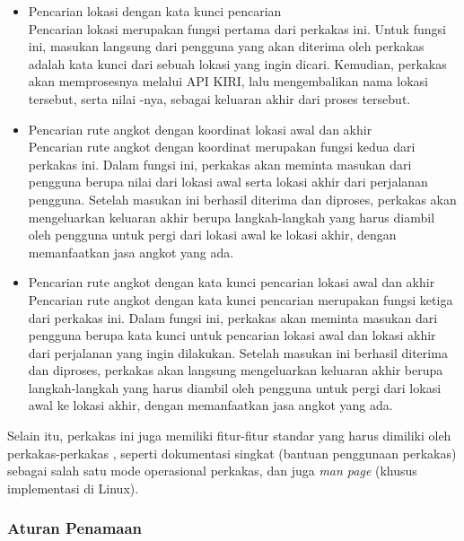 \begin{itemize}
	\item Pencarian lokasi dengan kata kunci pencarian\\
	Pencarian lokasi merupakan fungsi pertama dari perkakas ini. Untuk fungsi ini, masukan langsung dari pengguna yang akan diterima oleh perkakas adalah kata kunci dari sebuah lokasi yang ingin dicari. Kemudian, perkakas akan memprosesnya melalui API KIRI, lalu mengembalikan nama lokasi tersebut, serta nilai \latlon -nya, sebagai keluaran akhir dari proses tersebut.
	\vfill\newpage %
	\item Pencarian rute angkot dengan koordinat \latlon\xspace lokasi awal dan akhir\\
	Pencarian rute angkot dengan koordinat merupakan fungsi kedua dari perkakas ini. Dalam fungsi ini, perkakas akan meminta masukan dari pengguna berupa nilai \latlon\xspace dari lokasi awal serta lokasi akhir dari perjalanan pengguna. Setelah masukan ini berhasil diterima dan diproses, perkakas akan mengeluarkan keluaran akhir berupa langkah-langkah yang harus diambil oleh pengguna untuk pergi dari lokasi awal ke lokasi akhir, dengan memanfaatkan jasa angkot yang ada.
	\item Pencarian rute angkot dengan kata kunci pencarian lokasi awal dan akhir\\
	Pencarian rute angkot dengan kata kunci pencarian merupakan fungsi ketiga  dari perkakas ini. Dalam fungsi ini, perkakas akan meminta masukan dari pengguna berupa kata kunci untuk pencarian lokasi awal dan lokasi akhir dari perjalanan yang ingin dilakukan. Setelah masukan ini berhasil diterima dan diproses, perkakas akan langsung mengeluarkan keluaran akhir berupa langkah-langkah yang harus diambil oleh pengguna untuk pergi dari lokasi awal ke lokasi akhir, dengan memanfaatkan jasa angkot yang ada.
\end{itemize}
\vspace{\baselineskip}\noindent %
Selain itu, perkakas ini juga memiliki fitur-fitur standar yang harus dimiliki oleh perkakas-perkakas \cl, seperti dokumentasi singkat (bantuan penggunaan perkakas) sebagai salah satu mode operasional perkakas, dan juga \textit{man page} (khusus implementasi di Linux).
\vspace*{-0.5em} %
\subsubsection{Aturan Penamaan}
\label{sec:analysis-thesisapp-features-conventions}

